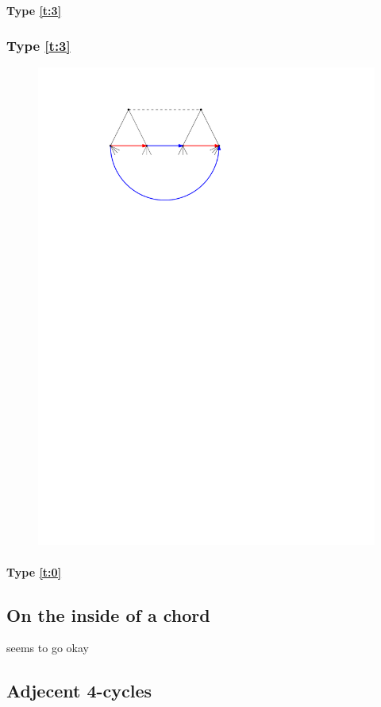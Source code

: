 \paragraph{Type \ref{t:3}}

\subsubsection{Type \ref{t:3}}

\begin{figure}[h]
  \centering
  \includegraphics[scale=1]{4cycles/img/fence_d}
  \caption{}
  \label{fig:}
\end{figure}

\paragraph{Type \ref{t:0}}


\subsection{On the inside of a chord}
seems to go okay

\subsection{Adjecent 4-cycles}
